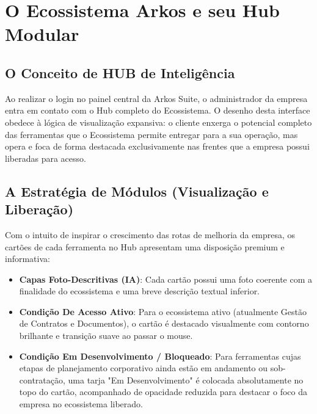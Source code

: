 \documentclass[12pt,a4paper,oneside]{report}
\begin{document}
\chapter{O Ecossistema Arkos e seu Hub Modular}

\section{O Conceito de HUB de Inteligência}
Ao realizar o login no painel central da Arkos Suite, o administrador da empresa entra em contato com o Hub completo do Ecossistema. O desenho desta interface obedece à lógica de visualização expansiva: o cliente enxerga o potencial completo das ferramentas que o Ecossistema permite entregar para a sua operação, mas opera e foca de forma destacada exclusivamente nas frentes que a empresa possui liberadas para acesso.

\section{A Estratégia de Módulos (Visualização e Liberação)}
Com o intuito de inspirar o crescimento das rotas de melhoria da empresa, os cartões de cada ferramenta no Hub apresentam uma disposição premium e informativa:
\begin{itemize}
    \item \textbf{Capas Foto-Descritivas (IA)}: Cada cartão possui uma foto coerente com a finalidade do ecossistema e uma breve descrição textual inferior.
    \item \textbf{Condição De Acesso Ativo}: Para o ecossistema ativo (atualmente Gestão de Contratos e Documentos), o cartão é destacado visualmente com contorno brilhante e transição suave ao passar o mouse.
    \item \textbf{Condição Em Desenvolvimento / Bloqueado}: Para ferramentas cujas etapas de planejamento corporativo ainda estão em andamento ou sob-contratação, uma tarja "Em Desenvolvimento" é colocada absolutamente no topo do cartão, acompanhado de opacidade reduzida para destacar o foco da empresa no ecossistema liberado.
\end{itemize}

\pagebreak




\end{document}
